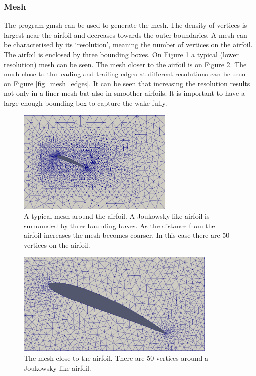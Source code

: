 \documentclass[12pt, a4paper]{article}
\begin{document}
\subsubsection{Mesh}
The program gmsh can be used to generate the mesh. The density of vertices is largest near the airfoil and decreases towards the outer boundaries. A mesh can be characterised by its `resolution', meaning the number of vertices on the airfoil. The airfoil is enclosed by three bounding boxes. On Figure \ref{fig_mesh_full} a typical (lower resolution) mesh can be seen. The mesh closer to the airfoil is on Figure \ref{fig_mesh_close}. The mesh close to the leading and trailing edges at different resolutions can be seen on Figure \ref{fig_mesh_edges}. It can be seen that increasing the resolution results not only in a finer mesh but also in smoother airfoils. It is important to have a large enough bounding box to capture the wake fully.
\begin{figure}[htbp]
    \centering
    \includegraphics[height=5cm]{mesh_1}
    \caption{A typical mesh around the airfoil. A Joukowsky-like airfoil is surrounded by three bounding boxes. As the distance from the airfoil increases the mesh becomes coarser. In this case there are 50 vertices on the airfoil.}
    \label{fig_mesh_full}
\end{figure}
\begin{figure}[htbp]
    \centering
    \includegraphics[height=5cm]{mesh_2}
    \caption{The mesh close to the airfoil. There are 50 vertices around a Joukowsky-like airfoil.}
    \label{fig_mesh_close}
\end{figure}
\end{document}
